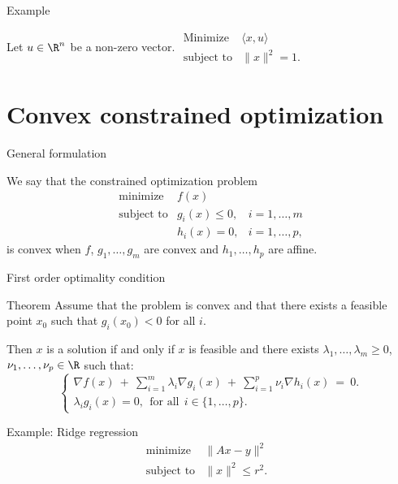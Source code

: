 \documentclass{beamer}
\begin{document}
\begin{frame}[t]{Example}
	\grid

	\vspace{-0.2cm}
	Let $u \in \R^n$ be a non-zero vector. \quad
	$
		\begin{array}{lll}
			\text{Minimize} & \langle x,u \rangle & \\
			\text{subject to} & \|x\|^2 = 1.
		\end{array}
	$
	\pause
\end{frame}


\section{Convex constrained optimization}


\begin{frame}[t]{General formulation}
	\grid

	We say that the constrained optimization problem
	\begin{equation}
		\begin{array}{lll}
			\text{minimize} & f(x) & \\
			\text{subject to} & g_i(x) \leq 0, & i=1, \dots, m \\
							  & h_i(x) = 0, & i=1, \dots, p,
		\end{array}
	\end{equation}
	is convex when $f$, $g_1, \dots, g_m$ are convex and $h_1, \dots, h_p$ are affine.
\end{frame}

\begin{frame}[t]{First order optimality condition}
	\grid

	\vspace{-0.4cm}
	\begin{block}{Theorem}
		Assume that the problem is convex and that there exists a feasible point $x_0$ such that $g_i(x_0) < 0$ for all $i$.

		Then $x$ is a solution if and only if $x$ is feasible and there exists $\lambda_1, \dots, \lambda_m \geq 0$, $\nu_1, \dots, \nu_p \in \R$ such that:
		$$
		\begin{cases}
			\displaystyle
			\nabla f(x) \ + \ \sum_{i=1}^m \lambda_i \nabla g_i(x) \ + \ \sum_{i=1}^p \nu_i \nabla h_i(x)  \ = \ 0. \\
			\lambda_i g_i(x) = 0, \ \ \text{for all} \ \ i \in \{1, \dots, p\}.
		\end{cases}
		$$
	\end{block}

\end{frame}
\begin{frame}[t]{Example: Ridge regression}
	\grid
	$$
		\begin{array}{lll}
			\text{minimize} & \|Ax-y\|^2 & \\
			\text{subject to} & \|x\|^2 \leq r^2.
		\end{array}
		$$
	 
\end{frame}
\end{document}
